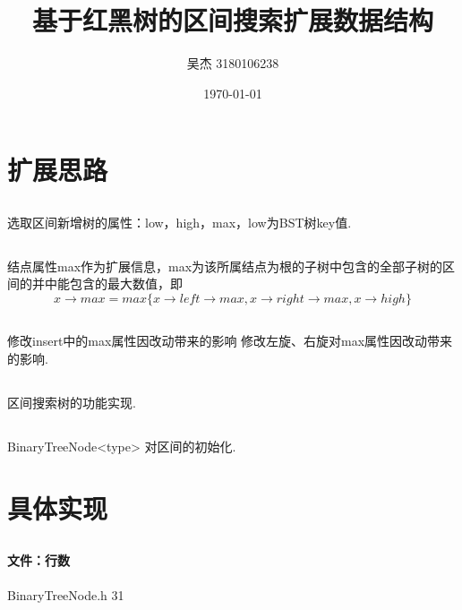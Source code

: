 \documentclass{article}
\title{基于红黑树的区间搜索扩展数据结构}
{}\author{吴杰 3180106238}
\date{\today}
\begin{document}
\maketitle

\section{扩展思路}

\subsection{}
选取区间新增树的属性：low，high，max，low为BST树key值.

\subsection{}
结点属性max作为扩展信息，max为该所属结点为根的子树中包含的全部子树的区间的并中能包含的最大数值，即\[x\to max = max\{x\to left \to max,x\to right \to max ,x\to high\}\]

\subsection{}
修改insert中的max属性因改动带来的影响
修改左旋、右旋对max属性因改动带来的影响.

\subsection{}
区间搜索树的功能实现.

\subsection{}
BinaryTreeNode<type> 对区间的初始化.

\section{具体实现}
\subsection{}
\paragraph{文件：行数}
BinaryTreeNode.h          31
\end{document}
